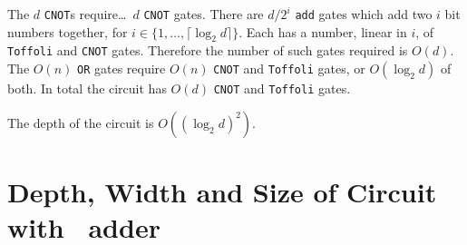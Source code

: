\documentclass[notitlepage]{article}
\theoremstyle{definition}
\begin{document}
The $d$ \texttt{CNOT}s require\dots\ $d$ \texttt{CNOT} gates.
There are $d/2^{i}$ \texttt{add} gates which add two $i$ bit numbers together, for $i \in \{1, \dots, \lceil \log_{2}d\rceil\}$. Each has a number, linear in $i$, of \texttt{Toffoli} and \texttt{CNOT} gates. Therefore the number of such gates required is $O(d)$.
The $O(n)$ \texttt{OR} gates require $O(n)$ \texttt{CNOT} and \texttt{Toffoli} gates, or $O(\log_{2}d)$ of both.
In total the circuit has $O(d)$ \texttt{CNOT} and \texttt{Toffoli} gates.

The depth of the circuit is $O\left({(\log_{2}d)}^{2}\right)$.

\section*{Depth, Width and Size of Circuit with~\cite{Takahashi:2008:FQC} adder}



\end{document}
